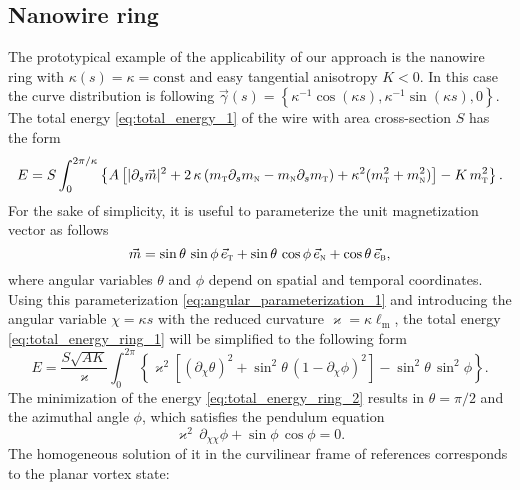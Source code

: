 \documentclass[showpacs,amsmath,amssymb,aps,pra,longbibliography,
10pt,preprint,superscriptaddress,showkeys]{revtex4-1}
\begin{document}
\subsection{Nanowire ring}\label{subsec:nanowire_ring}
The prototypical example of the applicability of our approach is the nanowire ring with $\kappa(s)=\kappa=\textrm{const}$ and easy tangential anisotropy $K<0$. In this case the curve distribution is following $\vec{\gamma}(s)=\left\lbrace \kappa^{-1} \cos(\kappa s), \kappa^{-1} \sin(\kappa s), 0 \right\rbrace$. The total energy \eqref{eq:total_energy_1} of the wire with area cross-section $S$ has the form
\begin{equation} \label{eq:total_energy_ring_1}
	E = S \int_{0}^{2 \pi/\kappa} \left\lbrace A \left[ |\partial_s\vec{m}|^2 + 2 \, \kappa \, (m_\textsc{t} \partial_s{m}_\textsc{n}-m_\textsc{n} \partial_s{m}_\textsc{t}) + \kappa^2 (m^2_\textsc{t}+m^2_\textsc{n}) \right] - K \, m^2_\textsc{t} \right\rbrace.
\end{equation}
For the sake of simplicity, it is useful to parameterize the unit magnetization vector as follows
\begin{equation} \label{eq:angular_parameterization_1}
	\vec{m}=\sin\theta \, \sin \phi \, \vec{e}_\textsc{t} + \sin\theta \, \cos \phi \, \vec{e}_\textsc{n} + \cos \theta \, \vec{e}_\textsc{b},
\end{equation}
where angular variables $\theta$ and $\phi$ depend on spatial and temporal coordinates. Using this parameterization \eqref{eq:angular_parameterization_1} and introducing the angular variable $\chi=\kappa s$ with the reduced curvature $\varkappa=\kappa \ell_\textrm{m}$, the total energy \eqref{eq:total_energy_ring_1} will be simplified to the following form~\cite{Sheka15}
\begin{equation} \label{eq:total_energy_ring_2}
	E = \dfrac{S \sqrt{A K}}{\varkappa} \int_{0}^{2 \pi} \left\lbrace \varkappa^2 \left[ (\partial_\chi \theta)^2 + \sin^2 \theta \, (1- \partial_\chi \phi)^2 \right] - \sin^2\theta \, \sin^2 \phi \right\rbrace.
\end{equation}
The minimization of the energy \eqref{eq:total_energy_ring_2} results in $\theta=\pi/2$ and the azimuthal angle $\phi$, which satisfies the pendulum equation
\begin{equation} \label{eq:pendulum}
	\varkappa^2 \, \partial_{\chi\chi} \phi + \sin \phi \, \cos \phi = 0.
\end{equation}
The homogeneous solution of it in the curvilinear frame of references corresponds to the planar vortex state:
\end{document}
